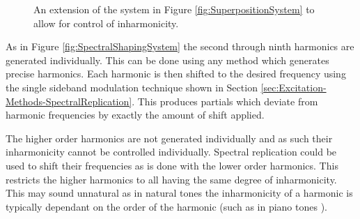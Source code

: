 \begin{figure}[h!]
			\caption{An extension of the system in Figure \ref{fig:SuperpositionSystem} to allow for control
			         of inharmonicity.}
			\label{fig:InharmonicitySystem}
		\end{figure}

		As in Figure \ref{fig:SpectralShapingSystem} the second through ninth harmonics are generated individually.
		This can be done using any method which generates precise harmonics. Each harmonic is then shifted to the
		desired frequency using the single sideband modulation technique shown in Section
		\ref{sec:Excitation-Methods-SpectralReplication}. This produces partials which deviate from harmonic
		frequencies by exactly the amount of shift applied.

		The higher order harmonics are not generated individually and as such their inharmonicity cannot be
		controlled individually. Spectral replication could be used to shift their frequencies as is done with the
		lower order harmonics. This restricts the higher harmonics to all having the same degree of inharmonicity.
		This may sound unnatural as in natural tones the inharmonicity of a harmonic is typically dependant on the
		order of the harmonic (such as in piano tones \citep{young1952inharmonicity}).

